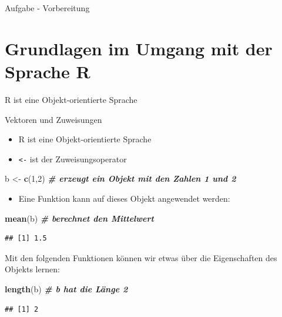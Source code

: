 \documentclass[
  ignorenonframetext,
]{beamer}
\newenvironment{Shaded}{\begin{snugshade}}{\end{snugshade}}
\newcommand{\CommentTok}[1]{\textcolor[rgb]{0.00,0.40,1.00}{\textbf{\textit{#1}}}}
\newcommand{\DecValTok}[1]{\textcolor[rgb]{0.27,0.67,0.26}{#1}}
\newcommand{\KeywordTok}[1]{\textcolor[rgb]{0.26,0.66,0.93}{\textbf{#1}}}
\newcommand{\NormalTok}[1]{\textcolor[rgb]{0.74,0.68,0.62}{#1}}
\newcommand{\StringTok}[1]{\textcolor[rgb]{0.02,0.61,0.04}{#1}}
\providecommand{\tightlist}{%
  \setlength{\itemsep}{0pt}\setlength{\parskip}{0pt}}
\begin{document}
\begin{frame}[fragile]{Aufgabe - Vorbereitung}
\end{frame}

\hypertarget{grundlagen-im-umgang-mit-der-sprache-r}{%
\section{Grundlagen im Umgang mit der Sprache
R}\label{grundlagen-im-umgang-mit-der-sprache-r}}

\begin{frame}[fragile]{R ist eine Objekt-orientierte Sprache}
\protect\hypertarget{r-ist-eine-objekt-orientierte-sprache}{}

Vektoren und Zuweisungen

\begin{itemize}
\tightlist
\item
  R ist eine Objekt-orientierte Sprache
\item
  \texttt{\textless{}-} ist der Zuweisungsoperator
\end{itemize}

\begin{Shaded}
\begin{Highlighting}[]
\NormalTok{b <-}\StringTok{ }\KeywordTok{c}\NormalTok{(}\DecValTok{1}\NormalTok{,}\DecValTok{2}\NormalTok{) }\CommentTok{# erzeugt ein Objekt mit den Zahlen 1 und 2}
\end{Highlighting}
\end{Shaded}

\begin{itemize}
\tightlist
\item
  Eine Funktion kann auf dieses Objekt angewendet werden:
\end{itemize}

\begin{Shaded}
\begin{Highlighting}[]
\KeywordTok{mean}\NormalTok{(b) }\CommentTok{# berechnet den Mittelwert}
\end{Highlighting}
\end{Shaded}

\begin{verbatim}
## [1] 1.5
\end{verbatim}

Mit den folgenden Funktionen können wir etwas über die Eigenschaften des
Objekts lernen:

\begin{Shaded}
\begin{Highlighting}[]
\KeywordTok{length}\NormalTok{(b) }\CommentTok{# b hat die Länge 2}
\end{Highlighting}
\end{Shaded}

\begin{verbatim}
## [1] 2
\end{verbatim}

\end{frame}
\end{document}
